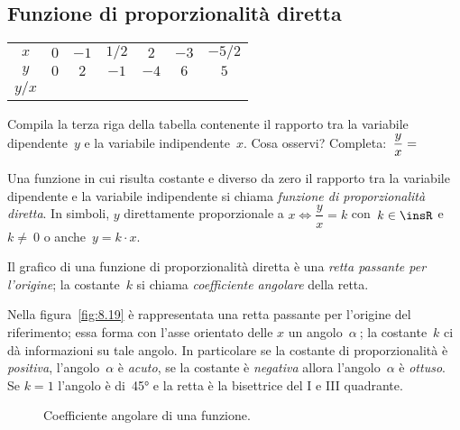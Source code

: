 \vspazio\ovalbox{\risolvii \ref{ese:\thechapter.39}, \ref{ese:\thechapter.40}}

\subsection{Funzione di proporzionalità diretta}
\begin{center}
 \begin{tabular}{ccccccc}
 \toprule
 $x$ & $0$ & $-1$ & $ 1/2$ & $2$ & $-3$ & $-5/2$\\
 $y$ & $0$ & $2$ & $-1$ & $-4$ & $6$ & $5$\\
 \midrule
 $y/x$ & & & & & & \\
 \bottomrule
 \end{tabular}
\end{center}
Compila la terza riga della tabella contenente il rapporto tra la variabile dipendente~$y$ e la variabile indipendente~$x$.
Cosa osservi? Completa:~$\dfrac{y}{x}=\dotfill$
\begin{definizione}
 Una funzione in cui risulta costante e diverso da zero il rapporto tra la variabile dipendente e la variabile indipendente
 si chiama \emph{funzione di proporzionalità diretta}. In simboli, $y$ direttamente proporzionale a
$x \Leftrightarrow \dfrac{y}{x}=k$ con~$k\in \insR$ e~$k\neq~0$ o anche~$y=k\cdot x$.
\end{definizione}
Il grafico di una funzione di proporzionalità diretta è una \emph{retta passante per l'origine};
la costante~$k$ si chiama \emph{coefficiente angolare} della retta.

Nella figura~\ref{fig:8.19} è rappresentata una retta passante per l'origine del riferimento; essa forma con l'asse orientato delle
$x$ un angolo~$\alpha~$; la costante~$k$ ci dà informazioni su tale angolo.
In particolare se la costante di proporzionalità è \emph{positiva}, l'angolo~$\alpha$ è \emph{acuto}, se la costante è
\emph{negativa} allora l'angolo~$\alpha$ è \emph{ottuso}. Se $k=1$ l'angolo è di~45° e la retta è la bisettrice del I e III quadrante.

\begin{figure}[hb]
 \begin{minipage}[t]{.45\textwidth}
  \centering
  \caption{Coefficiente angolare di una funzione.}\label{fig:8.19}
 \end{minipage}\hfil
 \begin{minipage}[t]{.45\textwidth}
  \centering
  \caption{}\label{fig:8.20}
 \end{minipage}
\end{figure}


